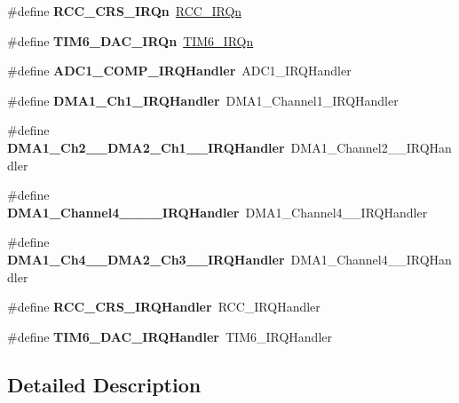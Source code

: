 \begin{DoxyCompactItemize}
\#define {\bfseries R\+C\+C\+\_\+\+C\+R\+S\+\_\+\+I\+R\+Qn}~\hyperlink{group___peripheral__interrupt__number__definition_gga7e1129cd8a196f4284d41db3e82ad5c8a5710b22392997bac63daa5c999730f77}{R\+C\+C\+\_\+\+I\+R\+Qn}
\item 
\mbox{\label{group__stm32f030x8_gad95202b3f62989995dea3404eefece19}} 
\#define {\bfseries T\+I\+M6\+\_\+\+D\+A\+C\+\_\+\+I\+R\+Qn}~\hyperlink{group___peripheral__interrupt__number__definition_gga7e1129cd8a196f4284d41db3e82ad5c8a99bd6662671832371d7c727046b147b2}{T\+I\+M6\+\_\+\+I\+R\+Qn}
\item 
\mbox{\label{group__stm32f030x8_gaeb3545df015f964b68346cda78f7cea5}} 
\#define {\bfseries A\+D\+C1\+\_\+\+C\+O\+M\+P\+\_\+\+I\+R\+Q\+Handler}~A\+D\+C1\+\_\+\+I\+R\+Q\+Handler
\item 
\mbox{\label{group__stm32f030x8_ga3f7debe9fc2548ab6640825967110101}} 
\#define {\bfseries D\+M\+A1\+\_\+\+Ch1\+\_\+\+I\+R\+Q\+Handler}~D\+M\+A1\+\_\+\+Channel1\+\_\+\+I\+R\+Q\+Handler
\item 
\mbox{\label{group__stm32f030x8_ga3752ab0b9a6635ccd7bc87b99ee8fd9b}} 
\#define {\bfseries D\+M\+A1\+\_\+\+Ch2\+\_\+\_\+\+D\+M\+A2\+\_\+\+Ch1\+\_\+\_\+\+I\+R\+Q\+Handler}~D\+M\+A1\+\_\+\+Channel2\+\_\+\_\+\+I\+R\+Q\+Handler
\item 
\mbox{\label{group__stm32f030x8_gae3db46ad17e9f800e0f88b489eed522d}} 
\#define {\bfseries D\+M\+A1\+\_\+\+Channel4\+\_\+\_\+\_\+\_\+\+I\+R\+Q\+Handler}~D\+M\+A1\+\_\+\+Channel4\+\_\+\_\+\+I\+R\+Q\+Handler
\item 
\mbox{\label{group__stm32f030x8_ga035f9aa47c046222541cca70e281b415}} 
\#define {\bfseries D\+M\+A1\+\_\+\+Ch4\+\_\+\_\+\+D\+M\+A2\+\_\+\+Ch3\+\_\+\_\+\+I\+R\+Q\+Handler}~D\+M\+A1\+\_\+\+Channel4\+\_\+\_\+\+I\+R\+Q\+Handler
\item 
\mbox{\label{group__stm32f030x8_ga82a9eac30db2cc914975bc71ce5fcb92}} 
\#define {\bfseries R\+C\+C\+\_\+\+C\+R\+S\+\_\+\+I\+R\+Q\+Handler}~R\+C\+C\+\_\+\+I\+R\+Q\+Handler
\item 
\mbox{\label{group__stm32f030x8_ga7d58a944f63161f2152026eedc430848}} 
\#define {\bfseries T\+I\+M6\+\_\+\+D\+A\+C\+\_\+\+I\+R\+Q\+Handler}~T\+I\+M6\+\_\+\+I\+R\+Q\+Handler
\end{DoxyCompactItemize}


\subsection{Detailed Description}
